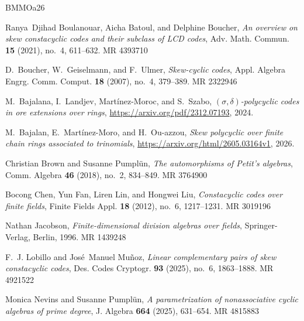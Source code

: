 \documentclass[11pt]{amsart}
\theoremstyle{plain}
\theoremstyle{definition}
\numberwithin{equation}{section}
\numberwithin{figure}{section}
\begin{document}
%
%
\providecommand{\bysame}{\leavevmode\hbox to3em{\hrulefill}\thinspace}
\providecommand{\MR}{\relax\ifhmode\unskip\space\fi MR }
\providecommand{\MRhref}[2]{%
  \href{http://www.ams.org/mathscinet-getitem?mr=#1}{#2}
}
\providecommand{\href}[2]{#2}
\begin{thebibliography}{BMMOa26}

Ranya~Djihad Boulanouar, Aicha Batoul, and Delphine Boucher, \emph{An overview on skew constacyclic codes and their subclass of {LCD} codes}, Adv. Math. Commun. \textbf{15} (2021), no.~4, 611--632. \MR{4393710}

D.~Boucher, W.~Geiselmann, and F.~Ulmer, \emph{Skew-cyclic codes}, Appl. Algebra Engrg. Comm. Comput. \textbf{18} (2007), no.~4, 379--389. \MR{2322946}

M.~Bajalana, I.~Landjev, Mart\'{i}nez-Moroc, and S.~Szabo, \emph{$(\sigma,\delta)$-polycyclic codes in ore extensions over rings}, \url{https://arxiv.org/pdf/2312.07193}, 2024.

M.~Bajalan, E.~Martínez-Moro, and H.~Ou-azzou, \emph{Skew polycyclic over finite chain rings associated to trinomials}, \url{https://arxiv.org/html/2605.03164v1}, 2026.

Christian Brown and Susanne Pumpl\"un, \emph{The automorphisms of {P}etit's algebras}, Comm. Algebra \textbf{46} (2018), no.~2, 834--849. \MR{3764900}

Bocong Chen, Yun Fan, Liren Lin, and Hongwei Liu, \emph{Constacyclic codes over finite fields}, Finite Fields Appl. \textbf{18} (2012), no.~6, 1217--1231. \MR{3019196}

Nathan Jacobson, \emph{Finite-dimensional division algebras over fields}, Springer-Verlag, Berlin, 1996. \MR{1439248}

F.~J. Lobillo and Jos\'e{}~Manuel Mu\~noz, \emph{Linear complementary pairs of skew constacyclic codes}, Des. Codes Cryptogr. \textbf{93} (2025), no.~6, 1863--1888. \MR{4921522}

Monica Nevins and Susanne Pumpl\"un, \emph{A parametrization of nonassociative cyclic algebras of prime degree}, J. Algebra \textbf{664} (2025), 631--654. \MR{4815883}


\end{thebibliography}
\end{document}

